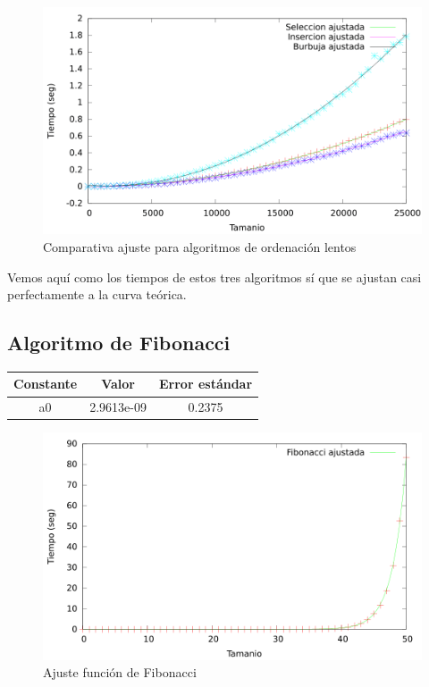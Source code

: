 \documentclass{article}
\begin{document}
	\begin{figure}[H]
		\centering
		\includegraphics[totalheight=8cm]{img/AlgOrdenacionLentos_ajustados}
		\caption{Comparativa ajuste para algoritmos de ordenación lentos}
		\label{fig:AlgOrdenacionLentos_ajustados}
	\end{figure}
	
	Vemos aquí como los tiempos de estos tres algoritmos sí que se ajustan casi perfectamente a la curva teórica.
	
	\subsection{Algoritmo de Fibonacci}
	
	
	\begin{longtable}{|c|c|c|}
		\hline
		Constante		& Valor			& Error estándar	\\ \hline
		a0              & 2.9613e-09	& 0.2375 \\ \hline
	\end{longtable}

	\begin{figure}[H]
		\centering
		\includegraphics[totalheight=8cm]{img/Fibonacci_ajustada}
		\caption{Ajuste función de Fibonacci}
		\label{fig:Fibonacci_ajustada}
	\end{figure}
	
\end{document}

